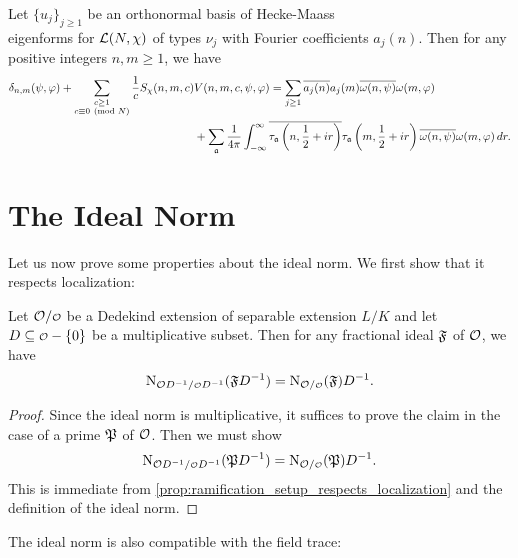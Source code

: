 \documentclass[12pt,oneside]{book}
\begin{document}
    \begin{theorem}
      Let $\{u_{j}\}_{j \ge 1}$ be an orthonormal basis of Hecke-Maass \\ eigenforms for $\mathcal{L}(N,\chi)$ of types $\nu_{j}$ with Fourier coefficients $a_{j}(n)$. Then for any positive integers $n,m \ge 1$, we have
      \begin{align*}
        \delta_{n,m}(\psi,\varphi)+\sum_{\substack{c \ge 1 \\ c \equiv 0 \ \left(\text{mod }N\right)}}\frac{1}{c}S_{\chi}(n,m,c)&V(n,m,c,\psi,\varphi) = \sum_{j \ge 1}\overline{a_{j}(n)}a_{j}(m)\overline{\omega(n,\psi)}\omega(m,\varphi) \\
        &+\sum_{\mathfrak{a}}\frac{1}{4\pi}\int_{-\infty}^{\infty}\overline{\tau_{\mathfrak{a}}\left(n,\frac{1}{2}+ir\right)}\tau_{\mathfrak{a}}\left(m,\frac{1}{2}+ir\right)\overline{\omega(n,\psi)}\omega(m,\varphi)\,dr.
      \end{align*}
    \end{theorem}
  \section{The Ideal Norm}
    Let us now prove some properties about the ideal norm. We first show that it respects localization:

    \begin{proposition}\label{prop:ideal_norm_respects_localizations}
      Let $\mc{O}/\smc{O}$ be a Dedekind extension of separable extension $L/K$ and let $D \subseteq \smc{O}-\{0\}$ be a multiplicative subset. Then for any fractional ideal $\mathfrak{F}$ of $\mathcal{O}$, we have
      \[
        \Norm_{\mc{O}D^{-1}/\smc{O}D^{-1}}(\mf{F}D^{-1}) = \Norm_{\mc{O}/\smc{O}}(\mf{F})D^{-1}.
      \]
    \end{proposition}
    \begin{proof}
      Since the ideal norm is multiplicative, it suffices to prove the claim in the case of a prime $\mathfrak{P}$ of $\mathcal{O}$. Then we must show
      \[
        \Norm_{\mc{O}D^{-1}/\smc{O}D^{-1}}(\mf{P}D^{-1}) = \Norm_{\mc{O}/\smc{O}}(\mf{P})D^{-1}.
      \]
      This is immediate from \cref{prop:ramification_setup_respects_localization} and the definition of the ideal norm.
    \end{proof}

    The ideal norm is also compatible with the field trace:
\end{document}
